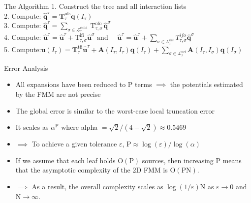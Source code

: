 \begin{frame}{The Algorithm}
  1. Construct the tree and all interaction lists\\
  \vspace{3mm}
  2. Compute: $\hat{\mathbf{q}}^{\tau}=\mathbf{T}_{\tau}^{\mathrm{ofs}} \mathbf{q}\left(I_{\tau}\right)$\\
  \vspace{3mm}
  3. Compute: $\hat{\mathbf{q}}^{\tau}=\sum_{\sigma \in \mathcal{L}_{\tau}^{\text {child }}} \mathrm{T}_{\tau, \sigma}^{\text {ofo }} \hat{\mathbf{q}}^{\sigma}$\\
  \vspace{3mm}
  4. Compute: $\hat{\mathbf{u}}^{\tau}=\hat{\mathbf{u}}^{\tau}+\mathrm{T}_{\tau, \sigma}^{\mathrm{ifi}} \hat{\mathbf{u}}^{\sigma} \text { and } \quad \hat{\boldsymbol{u}}^{\tau}=\hat{\boldsymbol{u}}^{\tau}+\sum_{\sigma \in L_{\tau}^{i n t}} T_{\tau, \sigma}^{i f o} \widehat{\boldsymbol{q}}^{\sigma}$\\
  \vspace{3mm}
  5. Compute:$\mathbf{u}\left(I_{\tau}\right)=\mathbf{T}_{\tau}^{\mathrm{tfi}}\hat{\mathbf{u}}^{\tau}+\mathbf{A}\left(I_{\tau}, I_{\tau}\right) \mathbf{q}\left(I_{\tau}\right)+\sum_{\sigma \in \mathcal{L}_{\tau}^{\mathrm{nei}}} \mathbf{A}\left(I_{\tau}, I_{\sigma}\right) \mathbf{q}\left(I_{\sigma}\right)$\\
\end{frame}

\begin{frame}{Error Analysis}
  \begin{itemize}
      \item All expansions have been reduced to P terms $\implies$ the potentials estimated by the FMM are not precise \\
       \vspace{3mm}
      \item The global error is similar to the worst-case local truncation error\\
       \vspace{3mm}
      \item It scales as $\alpha ^ \mathrm{P}$ where alpha $=\sqrt{2} /(4-\sqrt{2}) \approx 0.5469$\\
       \vspace{3mm}
      \item  $\implies$ To achieve a given tolerance $\varepsilon$, $\mathrm{P} \approx \log (\varepsilon) / \log (\alpha)$\\
       \vspace{3mm}
      \item If we assume that each leaf holds $\mathrm{O}(\mathrm{P})$ sources, then increasing P means that the asymptotic complexity of the 2D FMM is $\mathrm{O}(\mathrm{P} \mathrm{N})$. \\
       \vspace{3mm}
      \item $\implies$  As a result, the overall complexity scales as $\log (1 / \varepsilon) \mathrm{N}$ as $\varepsilon \rightarrow 0$ and $\mathrm{N} \rightarrow \infty$.
  \end{itemize}
\end{frame}
